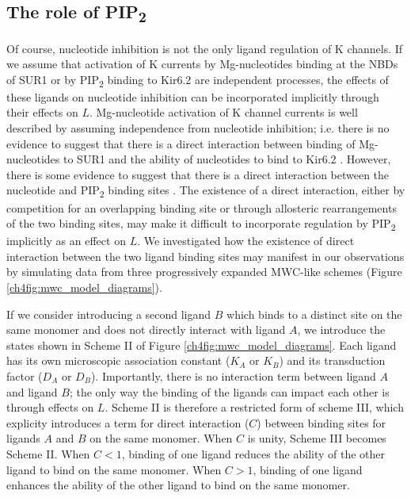 \subsection{The role of PIP\textsubscript{2}}

Of course, nucleotide inhibition is not the only ligand regulation of K\ATP{} channels.
If we assume that activation of K\ATP{} currents by Mg-nucleotides binding at the NBDs of SUR1 or by PIP\textsubscript{2} binding to Kir6.2 are independent processes, the effects of these ligands on nucleotide inhibition can be incorporated implicitly through their effects on $L$.
Mg-nucleotide activation of K\ATP{} channel currents is well described by assuming independence from nucleotide inhibition; i.e. there is no evidence to suggest that there is a direct interaction between binding of Mg-nucleotides to SUR1 and the ability of nucleotides to bind to Kir6.2 \cite{proks_activation_2010-1, vedovato_nucleotide-binding_2015}.
However, there is some evidence to suggest that there is a direct interaction between the nucleotide and PIP\textsubscript{2} binding sites \cite{fan_phosphoinositides_1999, macgregor_nucleotides_2002, proks_modeling_2009, haider_identification_2007}.
The existence of a direct interaction, either by competition for an overlapping binding site or through allosteric rearrangements of the two binding sites, may make it difficult to incorporate regulation by PIP\textsubscript{2} implicitly as an effect on $L$.
We investigated how the existence of direct interaction between the two ligand binding sites may manifest in our observations by simulating data from three progressively expanded MWC-like schemes (Figure \ref{ch4fig:mwc_model_diagrams}).

If we consider introducing a second ligand $B$ which binds to a distinct site on the same monomer and does not directly interact with ligand $A$, we introduce the states shown in Scheme II of Figure \ref{ch4fig:mwc_model_diagrams}.
Each ligand has its own microscopic association constant ($K_A$ or $K_B$) and its transduction factor ($D_A$ or $D_B$).
Importantly, there is no interaction term between ligand $A$ and ligand $B$; the only way the binding of the ligands can impact each other is through effects on $L$.
Scheme II is therefore a restricted form of scheme III, which explicity introduces a term for direct interaction ($C$) between binding sites for ligands $A$ and $B$ on the same monomer.
When $C$ is unity, Scheme III becomes Scheme II.
When $C<1$, binding of one ligand reduces the ability of the other ligand to bind on the same monomer.
When $C>1$, binding of one ligand enhances the ability of the other ligand to bind on the same monomer.

